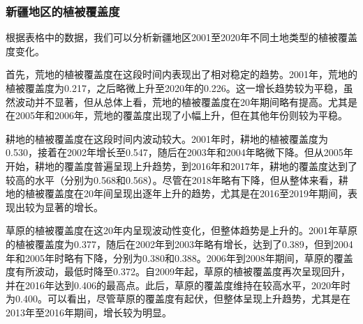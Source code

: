 \documentclass[AutoFakeBold]{LZUThesis-PgD&PhD}
\begin{document}
    
    \subsubsection{新疆地区的植被覆盖度}
            
    \par 根据表格中的数据，我们可以分析新疆地区2001至2020年不同土地类型的植被覆盖度变化。
    
    首先，荒地的植被覆盖度在这段时间内表现出了相对稳定的趋势。2001年，荒地的植被覆盖度为0.217，之后略微上升至2020年的0.226。这一增长趋势较为平稳，虽然波动并不显著，但从总体上看，荒地的植被覆盖度在20年期间略有提高。尤其是在2005年和2006年，荒地的覆盖度出现了小幅上升，但在其他年份则较为平稳。
    
    耕地的植被覆盖度在这段时间内波动较大。2001年时，耕地的植被覆盖度为0.530，接着在2002年增长至0.547，随后在2003年和2004年略微下降。但从2005年开始，耕地的覆盖度普遍呈现上升趋势，到2016年和2017年，耕地的覆盖度达到了较高的水平（分别为0.568和0.568）。尽管在2018年略有下降，但从整体来看，耕地的植被覆盖度在20年间呈现出逐年上升的趋势，尤其是在2016至2019年期间，表现出较为显著的增长。
    
    草原的植被覆盖度在这20年内呈现波动性变化，但整体趋势是上升的。2001年草原的植被覆盖度为0.377，随后在2002年到2003年略有增长，达到了0.389，但到2004年和2005年时略有下降，分别为0.380和0.388。2006年到2008年期间，草原的覆盖度有所波动，最低时降至0.372。自2009年起，草原的植被覆盖度再次呈现回升，并在2016年达到0.406的最高点。此后，草原的覆盖度维持在较高水平，2020年时为0.400。可以看出，尽管草原的覆盖度有起伏，但整体呈现上升趋势，尤其是在2013年至2016年期间，增长较为明显。
    
\end{document}
